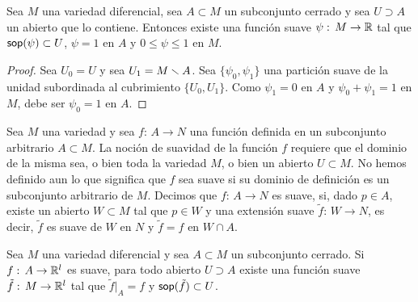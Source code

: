 \begin{propoHayChichones}\label{thm:haychichones}
	Sea $M$ una variedad diferencial, sea $A\subset M$ un subconjunto
	cerrado y sea $U\supset A$ un abierto que lo contiene. Entonces
	existe una funci\'{o}n suave $\psi:\,M\rightarrow\mathbb{R}$
	tal que $\mathsf{sop}(\psi)\subset U$, $\psi=1$ en $A$ y $0\leq\psi\leq 1$
	en $M$.
\end{propoHayChichones}

\begin{proof}
	Sea $U_{0}=U$ y sea $U_{1}=M\smallsetminus A$. Sea $\{\psi_{0},\psi_{1}\}$
	una partici\'{o}n suave de la unidad subordinada al cubrimiento
	$\{U_{0},U_{1}\}$. Como $\psi_{1}=0$ en $A$ y $\psi_{0}+\psi_{1}=1$
	en $M$, debe ser $\psi_{0}=1$ en $A$.
\end{proof}

Sea $M$ una variedad y sea $f:\,A\rightarrow N$ una funci\'{o}n definida
en un subconjunto arbitrario $A\subset M$. La noci\'{o}n de suavidad de
la funci\'{o}n $f$ requiere que el dominio de la misma sea, o bien toda
la variedad $M$, o bien un abierto $U\subset M$. No hemos definido aun
lo que significa que $f$ sea suave si su dominio de definici\'{o}n es
un subconjunto arbitrario de $M$. Decimos que $f:\,A\rightarrow N$ es
suave, si, dado $p\in A$, existe un abierto $W\subset M$ tal que $p\in W$
y una extensi\'{o}n suave $\tilde{f}:\,W\rightarrow N$, es decir,
$\tilde{f}$ es suave de $W$ en $N$ y $\tilde{f}=f$ en $W\cap A$.

\begin{propoExtenderFuncionesSuaves}\label{thm:extenderfuncionessuaves}
	Sea $M$ una variedad diferencial y sea $A\subset M$ un subconjunto
	cerrado. Si $f:\,A\rightarrow\mathbb{R}^{l}$ es suave, para todo abierto
	$U\supset A$ existe una funci\'{o}n suave
	$\tilde{f}:\,M\rightarrow\mathbb{R}^{l}$ tal que
	$\tilde{f}|_{A}=f$ y $\mathsf{sop}(\tilde{f})\subset U$.
\end{propoExtenderFuncionesSuaves}

